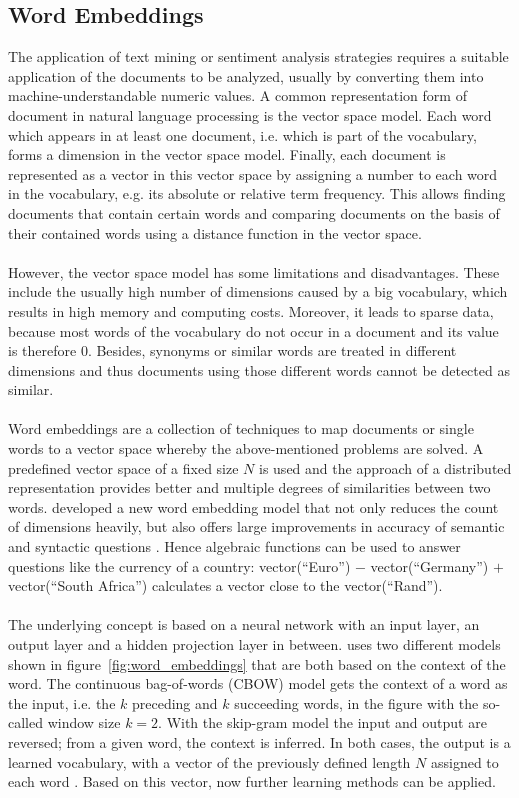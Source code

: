 \documentclass[article,type=msc,colorback,accentcolor=tud7b]{tudthesis}
\begin{document}
  \subsection{Word Embeddings}
  \label{subsec:word_embeddings}
    The application of text mining or sentiment analysis strategies requires a suitable application of the documents to be analyzed, usually by converting them into machine-understandable numeric values. A common representation form of document in natural language processing is the vector space model. Each word which appears in at least one document, i.e. which is part of the vocabulary, forms a dimension in the vector space model. Finally, each document is represented as a vector in this vector space by assigning a number to each word in the vocabulary, e.g. its absolute or relative term frequency. This allows finding documents that contain certain words and comparing documents on the basis of their contained words using a distance function in the vector space. \\\\
    However, the vector space model has some limitations and disadvantages. These include the usually high number of dimensions caused by a big vocabulary, which results in high memory and computing costs. Moreover, it leads to sparse data, because most words of the vocabulary do not occur in a document and its value is therefore $0$. Besides, synonyms or similar words are treated in different dimensions and thus documents using those different words cannot be detected as similar. \\\\
    Word embeddings are a collection of techniques to map documents or single words to a vector space whereby the above-mentioned problems are solved. A predefined vector space of a fixed size $N$ is used and the approach of a distributed representation provides better and multiple degrees of similarities between two words. \citeauthor{Mikolov2013} developed a new word embedding model that not only reduces the count of dimensions heavily, but also offers large improvements in accuracy of semantic and syntactic questions \autocite{Mikolov2013}. Hence algebraic functions can be used to answer questions like the currency of a country: vector(“Euro”) $-$ vector(“Germany”) $+$ vector(“South Africa”) calculates a vector close to the vector(“Rand”). \\\\
    The underlying concept is based on a neural network with an input layer, an output layer and a hidden projection layer in between. \citeauthor{Mikolov2013} uses two different models shown in figure~\ref{fig:word_embeddings} that are both based on the context of the word. The continuous bag-of-words (CBOW) model gets the context of a word as the input, i.e. the $k$ preceding and $k$ succeeding words, in the figure with the so-called window size $k=2$. With the skip-gram model the input and output are reversed; from a given word, the context is inferred. In both cases, the output is a learned vocabulary, with a vector of the previously defined length $N$ assigned to each word \autocite{Mikolov2013}. Based on this vector, now further learning methods can be applied.
 
\end{document}

